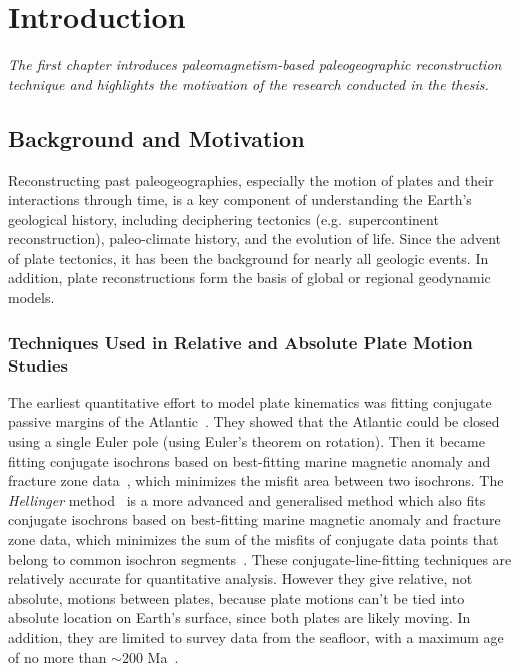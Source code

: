 \chapter{Introduction}\label{chap:Intro}
\textit{The first chapter introduces paleomagnetism-based paleogeographic
reconstruction technique and highlights the motivation of the research conducted
in the thesis.}
\vfill
\minitoc\newpage

\section{Background and Motivation}

Reconstructing past paleogeographies, especially the motion of plates and their
interactions through time, is a key component of understanding the Earth's
geological history, including deciphering tectonics (e.g.\ supercontinent
reconstruction), paleo-climate history, and the evolution of life. Since the
advent of plate tectonics, it has been the background for nearly all geologic
events. In addition, plate reconstructions form the basis of global or regional
geodynamic models.

\subsection{Techniques Used in Relative and Absolute Plate Motion Studies}

The earliest quantitative effort to model plate kinematics was fitting conjugate
passive margins of the Atlantic~\citep{B65,W07}. They showed that the Atlantic
could be closed using a single Euler pole (using Euler's theorem on rotation).
Then it became fitting conjugate isochrons based on best-fitting marine magnetic
anomaly and fracture zone data~\citep{M71}, which minimizes the misfit area
between two isochrons. The \emph{Hellinger} method~\citep{H81} is a more
advanced and generalised method which also fits conjugate isochrons based on
best-fitting marine magnetic anomaly and fracture zone data, which minimizes the
sum of the misfits of conjugate data points that belong to common isochron
segments~\citep{W07}. These conjugate-line-fitting techniques are relatively
accurate for quantitative analysis. However they give relative, not absolute,
motions between plates, because plate motions can't be tied into absolute
location on Earth's surface, since both plates are likely moving. In addition,
they are limited to survey data from the seafloor, with a maximum age of no more
than ${\sim}200$ Ma~\citep{M08}.

